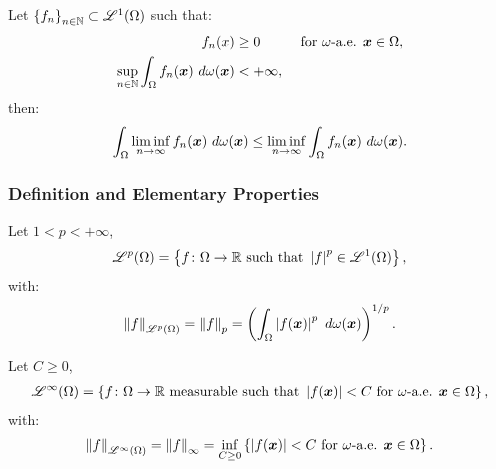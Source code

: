 \begin{lemma}[Fatou]
    Let $\left\{ f_n \right\}_{n \in \mathbb{N}} \subset \mathscr{L}^{1}(\Omega)$ such that:
    \begin{align}
        f_n(x) & \geq 0 &\text{ for } \omega \text{-a.e. } \bm{x} \in \Omega, \\
        \sup_{n \in \mathbb{N}} \int_{\Omega} f_n(\bm{x}) ~ d \omega(\bm{x}) & < +\infty,
    \end{align}
    then:
    \begin{align}
        \int_{\Omega} \liminf_{n \rightarrow \infty} f_n(\bm{x}) ~ d \omega(\bm{x}) \leq \liminf_{n \rightarrow \infty} \int_{\Omega} f_n(\bm{x}) ~ d \omega(\bm{x}).
    \end{align}
\end{lemma}

\newpage
\subsubsection{Definition and Elementary Properties}

\begin{definition}
    Let $1 < p < +\infty$,
    \begin{align}
        \mathscr{L}^{p}(\Omega) = \left\{ f \colon \Omega \rightarrow \mathbb{R} \text{ such that } \left| f \right|^p \in \mathscr{L}^{1}(\Omega) \right\},
    \end{align}
    with:
    \begin{align}
    \left\lVert f \right\rVert_{\mathscr{L}^{p}(\Omega)} = \left\lVert f \right\rVert_{p} = \left( \int_{\Omega} \left\lvert f(\bm{x}) \right\rvert^p ~ d \omega(\bm{x}) \right)^{1/p}.
    \end{align}
\end{definition}

\begin{definition}[$\SpaceLp{\infty}(\Omega)$]
    Let $C \geq 0$,
    \begin{align}
        \mathscr{L}^{\infty}(\Omega) = \left\{ f \colon \Omega \rightarrow \mathbb{R} \text{ measurable such that } \left\lvert f(\bm{x}) \right\rvert < C \text{ for } \omega \text{-a.e. } \bm{x} \in \Omega \right\},
    \end{align}
    with:
    \begin{align}
    \left\lVert f \right\rVert_{\mathscr{L}^{\infty}(\Omega)} = \left\lVert f \right\rVert_{\infty} = \inf_{C \geq 0} \left\{ \left\lvert f(\bm{x}) \right\rvert < C \text{ for } \omega \text{-a.e. } \bm{x} \in \Omega \right\}.
    \end{align}
\end{definition}

